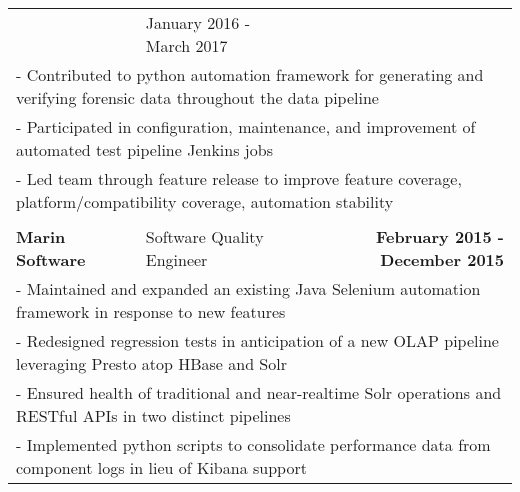 \documentclass[letterpaper]{article}
\begin{document}
\begin{center}
\begin{tabular}{p{}p{}r}
			  &
			  {January 2016 - March 2017 \quad\quad\quad\quad}
		  \\
			  \multicolumn{3}{p{\textwidth}}{\quad\quad - Contributed to python automation framework for generating and verifying forensic data throughout the data pipeline} 
		  \\
			  \multicolumn{3}{p{\textwidth}}{\quad\quad - Participated in configuration, maintenance, and improvement of automated test pipeline Jenkins jobs}
		  \\
			  \multicolumn{3}{p{\textwidth}}{\quad\quad - Led team through feature release to improve feature coverage, platform/compatibility coverage, automation stability}  
		  \\
		  \\
				\textbf{Marin Software}									&
				Software Quality Engineer										&
				\textbf{February 2015 - December 2015 \quad}
			\\
				\multicolumn{3}{p{\textwidth}}{\quad\quad - Maintained and expanded an existing Java Selenium automation framework in response to new features} 
			\\
				\multicolumn{3}{p{\textwidth}}{\quad\quad - Redesigned regression tests in anticipation of a new OLAP pipeline leveraging Presto atop HBase and Solr} 
			\\
				\multicolumn{3}{p{\textwidth}}{\quad\quad - Ensured health of traditional and near-realtime Solr operations and RESTful APIs in two distinct pipelines } 
			\\
				\multicolumn{3}{p{\textwidth}}{\quad\quad - Implemented python scripts to consolidate performance data from component logs in lieu of Kibana support } 

\end{tabular}
\end{center}
\end{document}
